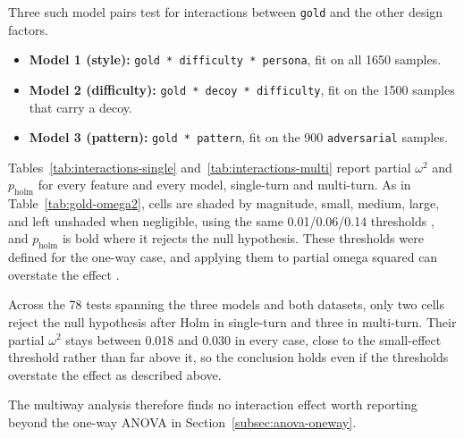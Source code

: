 \raggedbottom

Three such model pairs test for interactions between \texttt{gold} and the other design factors.

\begin{itemize}
    \item \textbf{Model 1 (style):} \texttt{gold * difficulty * persona}, fit on all 1650 samples.
    \item \textbf{Model 2 (difficulty):} \texttt{gold * decoy * difficulty}, fit on the 1500 samples that carry a decoy.
    \item \textbf{Model 3 (pattern):} \texttt{gold * pattern}, fit on the 900 \texttt{adversarial} samples.
\end{itemize}

Tables~\ref{tab:interactions-single} and~\ref{tab:interactions-multi} report partial $\omega^2$ and $p_{\text{holm}}$ for every feature and every model, single-turn and multi-turn. As in Table~\ref{tab:gold-omega2}, cells are shaded by magnitude, \colorbox{omegaSmall}{small}, \colorbox{omegaMedium}{medium}, \colorbox{omegaLarge}{large}, and left unshaded when negligible, using the same 0.01/0.06/0.14 thresholds \citep{cohenStatisticalPowerAnalysis2013}, and $p_{\text{holm}}$ is bold where it rejects the null hypothesis. These thresholds were defined for the one-way case, and applying them to partial omega squared can overstate the effect \citep{olejnikGeneralizedEtaOmega2003}.

Across the 78 tests spanning the three models and both datasets, only two cells reject the null hypothesis after Holm in single-turn and three in multi-turn. Their partial $\omega^2$ stays between 0.018 and 0.030 in every case, close to the small-effect threshold rather than far above it, so the conclusion holds even if the thresholds overstate the effect as described above.

The multiway analysis therefore finds no interaction effect worth reporting beyond the one-way ANOVA in Section~\ref{subsec:anova-oneway}.

